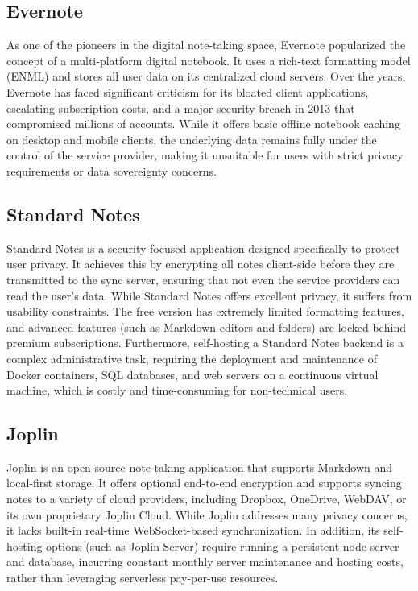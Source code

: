 \documentclass[12pt, a4paper, oneside]{report}
\begin{document}
\subsection{Evernote}
As one of the pioneers in the digital note-taking space, Evernote popularized the concept of a multi-platform digital notebook. It uses a rich-text formatting model (ENML) and stores all user data on its centralized cloud servers. Over the years, Evernote has faced significant criticism for its bloated client applications, escalating subscription costs, and a major security breach in 2013 that compromised millions of accounts. While it offers basic offline notebook caching on desktop and mobile clients, the underlying data remains fully under the control of the service provider, making it unsuitable for users with strict privacy requirements or data sovereignty concerns.

\subsection{Standard Notes}
Standard Notes is a security-focused application designed specifically to protect user privacy. It achieves this by encrypting all notes client-side before they are transmitted to the sync server, ensuring that not even the service providers can read the user's data. While Standard Notes offers excellent privacy, it suffers from usability constraints. The free version has extremely limited formatting features, and advanced features (such as Markdown editors and folders) are locked behind premium subscriptions. Furthermore, self-hosting a Standard Notes backend is a complex administrative task, requiring the deployment and maintenance of Docker containers, SQL databases, and web servers on a continuous virtual machine, which is costly and time-consuming for non-technical users.

\subsection{Joplin}
Joplin is an open-source note-taking application that supports Markdown and local-first storage. It offers optional end-to-end encryption and supports syncing notes to a variety of cloud providers, including Dropbox, OneDrive, WebDAV, or its own proprietary Joplin Cloud. While Joplin addresses many privacy concerns, it lacks built-in real-time WebSocket-based synchronization. In addition, its self-hosting options (such as Joplin Server) require running a persistent node server and database, incurring constant monthly server maintenance and hosting costs, rather than leveraging serverless pay-per-use resources.
\end{document}
